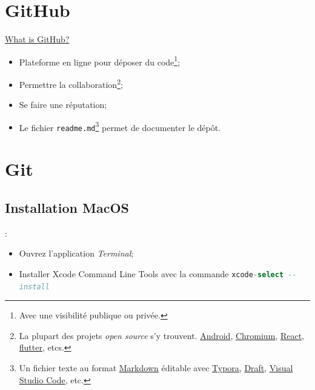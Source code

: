 \documentclass[10pt]{beamer}
\begin{document}
\section{GitHub}
\begin{frame}{\secname}
    \begin{center}
        \href{https://www.youtube.com/watch?v=w3jLJU7DT5E}{What is GitHub?}
    \end{center}
\end{frame}

\begin{frame}{\secname}
    \begin{itemize}
        \item Plateforme en ligne pour déposer du code\footnote{Avec une visibilité publique ou privée.};
        \item Permettre la collaboration\footnote{La plupart des projets \emph{open source} s’y trouvent. \href{https://github.com/android}{Android}, \href{https://github.com/chromium/chromium}{Chromium}, \href{https://github.com/facebook/react}{React}, \href{https://github.com/flutter/flutter}{flutter}, etcs.};
        \item Se faire une réputation;
        \item Le fichier \lstinline[language=git]!readme.md!\footnote{Un fichier texte au format \href{https://fr.wikipedia.org/wiki/Markdown}{Markdown} éditable avec \href{https://typora.io}{Typora}, \href{https://draftin.com}{Draft}, \href{https://code.visualstudio.com}{Visual Studio Code}, etc.} permet de documenter le dépôt.
    \end{itemize}
\end{frame}

\section{Git}
\subsection{Installation MacOS}

\begin{frame}{\secname : \subsecname}
    \begin{itemize}
        \item Ouvrez l'application \emph{Terminal};
        \item Installer Xcode Command Line Tools avec la commande \lstinline[language=sql]!xcode-select --install!
    \end{itemize}
\end{frame}
\end{document}
